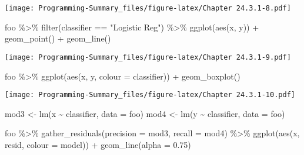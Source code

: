 \documentclass[
]{article}
\newenvironment{Shaded}{\begin{snugshade}}{\end{snugshade}}
\newcommand{\AttributeTok}[1]{\textcolor[rgb]{0.77,0.63,0.00}{#1}}
\newcommand{\FloatTok}[1]{\textcolor[rgb]{0.00,0.00,0.81}{#1}}
\newcommand{\FunctionTok}[1]{\textcolor[rgb]{0.00,0.00,0.00}{#1}}
\newcommand{\NormalTok}[1]{#1}
\newcommand{\OtherTok}[1]{\textcolor[rgb]{0.56,0.35,0.01}{#1}}
\newcommand{\SpecialCharTok}[1]{\textcolor[rgb]{0.00,0.00,0.00}{#1}}
\newcommand{\StringTok}[1]{\textcolor[rgb]{0.31,0.60,0.02}{#1}}
\begin{document}
\texttt{[image: Programming-Summary\_files/figure-latex/Chapter 24.3.1-8.pdf]}

\begin{Shaded}
\begin{Highlighting}[]
\NormalTok{foo }\SpecialCharTok{\%\textgreater{}\%} 
  \FunctionTok{filter}\NormalTok{(classifier }\SpecialCharTok{==} \StringTok{"Logistic Reg"}\NormalTok{) }\SpecialCharTok{\%\textgreater{}\%} 
  \FunctionTok{ggplot}\NormalTok{(}\FunctionTok{aes}\NormalTok{(x, y)) }\SpecialCharTok{+} 
  \FunctionTok{geom\_point}\NormalTok{() }\SpecialCharTok{+} 
  \FunctionTok{geom\_line}\NormalTok{() }
\end{Highlighting}
\end{Shaded}

\texttt{[image: Programming-Summary\_files/figure-latex/Chapter 24.3.1-9.pdf]}

\begin{Shaded}
\begin{Highlighting}[]
\NormalTok{foo }\SpecialCharTok{\%\textgreater{}\%} 
  \FunctionTok{ggplot}\NormalTok{(}\FunctionTok{aes}\NormalTok{(x, y, }\AttributeTok{colour =}\NormalTok{ classifier)) }\SpecialCharTok{+}
  \FunctionTok{geom\_boxplot}\NormalTok{()}
\end{Highlighting}
\end{Shaded}

\texttt{[image: Programming-Summary\_files/figure-latex/Chapter 24.3.1-10.pdf]}

\begin{Shaded}
\begin{Highlighting}[]
\NormalTok{mod3 }\OtherTok{\textless{}{-}} \FunctionTok{lm}\NormalTok{(x }\SpecialCharTok{\textasciitilde{}}\NormalTok{ classifier, }\AttributeTok{data =}\NormalTok{ foo)}
\NormalTok{mod4 }\OtherTok{\textless{}{-}} \FunctionTok{lm}\NormalTok{(y }\SpecialCharTok{\textasciitilde{}}\NormalTok{ classifier, }\AttributeTok{data =}\NormalTok{ foo)}

\NormalTok{foo }\SpecialCharTok{\%\textgreater{}\%} 
  \FunctionTok{gather\_residuals}\NormalTok{(}\AttributeTok{precision =}\NormalTok{ mod3, }\AttributeTok{recall =}\NormalTok{ mod4) }\SpecialCharTok{\%\textgreater{}\%} 
  \FunctionTok{ggplot}\NormalTok{(}\FunctionTok{aes}\NormalTok{(x, resid, }\AttributeTok{colour =}\NormalTok{ model)) }\SpecialCharTok{+}
  \FunctionTok{geom\_line}\NormalTok{(}\AttributeTok{alpha =} \FloatTok{0.75}\NormalTok{)}
\end{Highlighting}
\end{Shaded}
\end{document}
